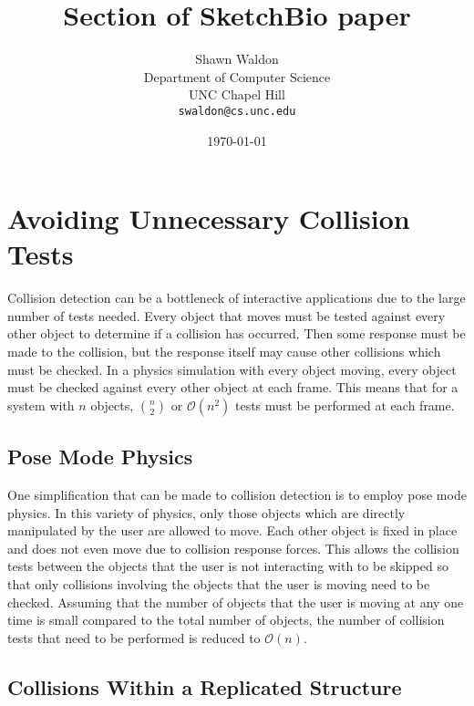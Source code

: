 \documentclass{article} %
\begin{document}
\title{Section of SketchBio paper}
\author{Shawn Waldon\\Department of Computer Science\\
			UNC Chapel Hill\\\texttt{swaldon@cs.unc.edu}}
\date{\today}
\maketitle

\section{Avoiding Unnecessary Collision Tests}
Collision detection can be a bottleneck of interactive applications due to the large number of tests needed.  Every object that moves must be tested against every other object to determine if a collision has occurred.  Then some response must be made to the collision, but the response itself may cause other collisions which must be checked.  In a physics simulation with every object moving, every object must be checked against every other object at each frame.  This means that for a system with $n$ objects, ${n \choose 2}$ or $\mathcal{O}(n^2)$ tests must be performed at each frame.

\subsection{Pose Mode Physics}
One simplification that can be made to collision detection is to employ pose mode physics.  In this variety of physics, only those objects which are directly manipulated by the user are allowed to move.  Each other object is fixed in place and does not even move due to collision response forces.  This allows the collision tests between the objects that the user is not interacting with to be skipped so that only collisions involving the objects that the user is moving need to be checked.  Assuming that the number of objects that the user is moving at any one time is small compared to the total number of objects, the number of collision tests that need to be performed is reduced to $\mathcal{O}(n)$.

\subsection{Collisions Within a Replicated Structure}

\end{document}

